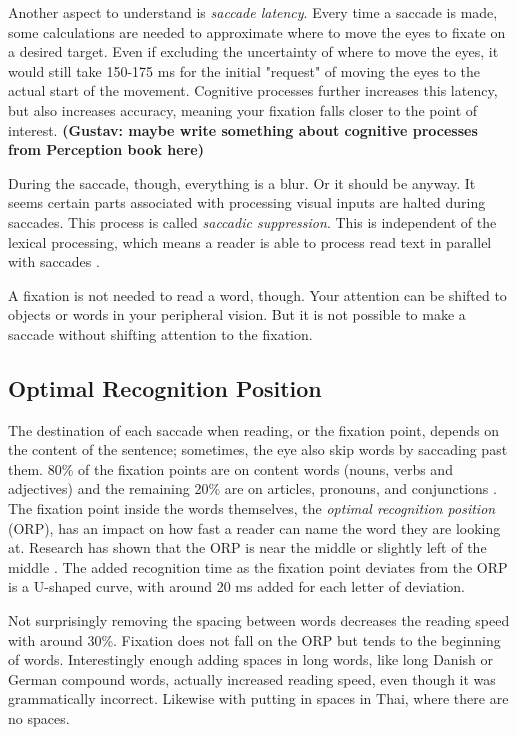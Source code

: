 Another aspect to understand is \textit{saccade latency}. Every time a saccade is made, some calculations are needed to approximate where to move the eyes to fixate on a desired target. Even if excluding the uncertainty of where to move the eyes, it would still take 150-175 ms for the initial "request" of moving the eyes to the actual start of the movement. Cognitive processes further increases this latency, but also increases accuracy, meaning your fixation falls closer to the point of interest.
\textbf{
(Gustav: maybe write something about cognitive processes from Perception book here)}

During the saccade, though, everything is a blur. Or it should be anyway. It seems certain parts associated with processing visual inputs are halted during saccades. This process is called \textit{saccadic suppression}. This is independent of the lexical processing, which means a reader is able to process read text in parallel with saccades \cite{KILDE MATHIAS}.

A fixation is not needed to read a word, though. Your attention can be shifted to objects or words in your peripheral vision. But it is not possible to make a saccade without shifting attention to the fixation.

\subsection{Optimal Recognition Position} \label{ORP}
The destination of each saccade when reading, or the fixation point, depends on the content of the sentence; sometimes, the eye also skip words by saccading past them. 80\% of the fixation points are on content words (nouns, verbs and adjectives) and the remaining 20\% are on articles, pronouns, and conjunctions \cite{eysenck_cognitive_2010}. The fixation point inside the words themselves, the \textit{optimal recognition position} (ORP), has an impact on how fast a reader can name the word they are looking at. Research has shown that the ORP is near the middle or slightly left of the middle \cite{oregan_optimal_1992, nazir_letter_1998, oregan_convenient_1984}. The added recognition time as the fixation point deviates from the ORP is a U-shaped curve, with around 20 ms added for each letter of deviation.

Not surprisingly removing the spacing between words decreases the reading speed with around 30\%. Fixation does not fall on the ORP but tends to the beginning of words. Interestingly enough adding spaces in long words, like long Danish or German compound words, actually increased reading speed, even though it was grammatically incorrect. Likewise with putting in spaces in Thai, where there are no spaces.

